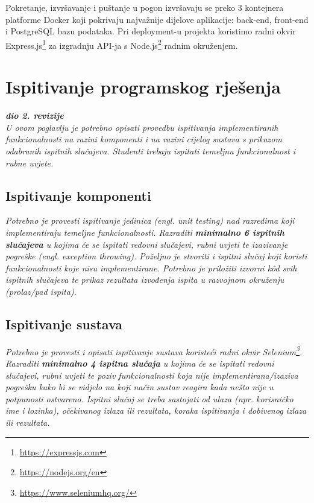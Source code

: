 Pokretanje, izvršavanje i puštanje u pogon izvršavaju se preko 3 kontejnera platforme Docker koji pokrivaju najvažnije dijelove aplikacije: back-end, front-end i PostgreSQL bazu podataka. Pri deployment-u projekta koristimo radni okvir Express.js\footnote{\url{https://expressjs.com}} za izgradnju API-ja s Node.js\footnote{\url{https://nodejs.org/en}} radnim okruženjem.

			
			\eject 
		
	
		\section{Ispitivanje programskog rješenja}
			
			\textbf{\textit{dio 2. revizije}}\\
			
			 \textit{U ovom poglavlju je potrebno opisati provedbu ispitivanja implementiranih funkcionalnosti na razini komponenti i na razini cijelog sustava s prikazom odabranih ispitnih slučajeva. Studenti trebaju ispitati temeljnu funkcionalnost i rubne uvjete.}
	
			
			\subsection{Ispitivanje komponenti}
			\textit{Potrebno je provesti ispitivanje jedinica (engl. unit testing) nad razredima koji implementiraju temeljne funkcionalnosti. Razraditi \textbf{minimalno 6 ispitnih slučajeva} u kojima će se ispitati redovni slučajevi, rubni uvjeti te izazivanje pogreške (engl. exception throwing). Poželjno je stvoriti i ispitni slučaj koji koristi funkcionalnosti koje nisu implementirane. Potrebno je priložiti izvorni kôd svih ispitnih slučajeva te prikaz rezultata izvođenja ispita u razvojnom okruženju (prolaz/pad ispita). }
			
			
			
			\subsection{Ispitivanje sustava}
			
			 \textit{Potrebno je provesti i opisati ispitivanje sustava koristeći radni okvir Selenium\footnote{\url{https://www.seleniumhq.org/}}. Razraditi \textbf{minimalno 4 ispitna slučaja} u kojima će se ispitati redovni slučajevi, rubni uvjeti te poziv funkcionalnosti koja nije implementirana/izaziva pogrešku kako bi se vidjelo na koji način sustav reagira kada nešto nije u potpunosti ostvareno. Ispitni slučaj se treba sastojati od ulaza (npr. korisničko ime i lozinka), očekivanog izlaza ili rezultata, koraka ispitivanja i dobivenog izlaza ili rezultata.\\ }
			 
